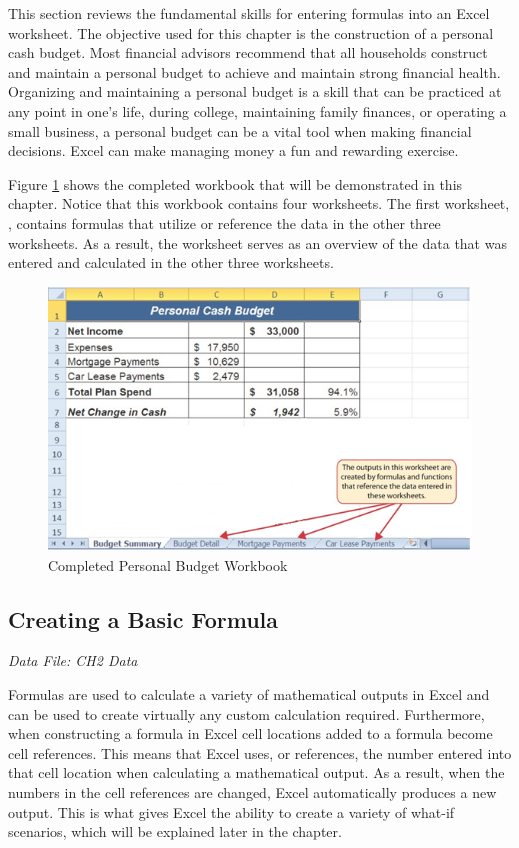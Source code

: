 This section reviews the fundamental skills for entering formulas into an Excel worksheet. The objective used for this chapter is the construction of a personal cash budget. Most financial advisors recommend that all households construct and maintain a personal budget to achieve and maintain strong financial health. Organizing and maintaining a personal budget is a skill that can be practiced at any point in one's life, during college, maintaining family finances, or operating a small business, a personal budget can be a vital tool when making financial decisions. Excel can make managing money a fun and rewarding exercise.

Figure \ref{02:fig01} shows the completed workbook that will be demonstrated in this chapter. Notice that this workbook contains four worksheets. The first worksheet, , contains formulas that utilize or reference the data in the other three worksheets. As a result, the  worksheet serves as an overview of the data that was entered and calculated in the other three worksheets.

\begin{figure}[H]
	\centering
	\includegraphics[width=\maxwidth{.95\linewidth}]{gfx/ch02_fig01}
	\caption{Completed Personal Budget Workbook}
	\label{02:fig01}
\end{figure}

\subsection{Creating a Basic Formula}

\textit{Data File: CH2 Data}

Formulas are used to calculate a variety of mathematical outputs in Excel and can be used to create virtually any custom calculation required. Furthermore, when constructing a formula in Excel cell locations added to a formula become cell references. This means that Excel uses, or references, the number entered into that cell location when calculating a mathematical output. As a result, when the numbers in the cell references are changed, Excel automatically produces a new output. This is what gives Excel the ability to create a variety of what-if scenarios, which will be explained later in the chapter.

